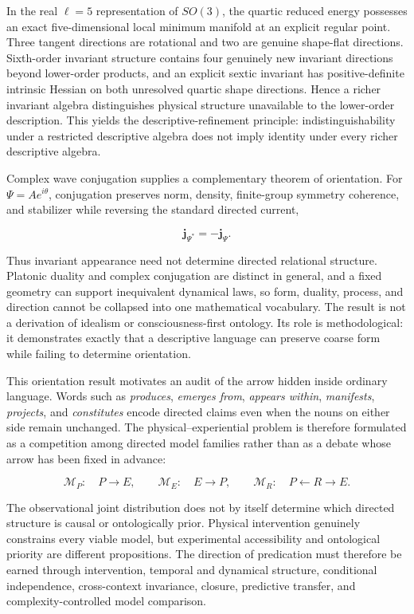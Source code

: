 In the real $\ell=5$ representation of $SO(3)$, the quartic reduced energy possesses an exact five-dimensional local minimum manifold at an explicit regular point. Three tangent directions are rotational and two are genuine shape-flat directions. Sixth-order invariant structure contains four genuinely new invariant directions beyond lower-order products, and an explicit sextic invariant has positive-definite intrinsic Hessian on both unresolved quartic shape directions. Hence a richer invariant algebra distinguishes physical structure unavailable to the lower-order description. This yields the descriptive-refinement principle: indistinguishability under a restricted descriptive algebra does not imply identity under every richer descriptive algebra.

Complex wave conjugation supplies a complementary theorem of orientation. For $\Psi=Ae^{i\theta}$, conjugation preserves norm, density, finite-group symmetry coherence, and stabilizer while reversing the standard directed current,

\[
\mathbf j_{\Psi^*}=-\mathbf j_\Psi.
\]

Thus invariant appearance need not determine directed relational structure. Platonic duality and complex conjugation are distinct in general, and a fixed geometry can support inequivalent dynamical laws, so form, duality, process, and direction cannot be collapsed into one mathematical vocabulary. The result is not a derivation of idealism or consciousness-first ontology. Its role is methodological: it demonstrates exactly that a descriptive language can preserve coarse form while failing to determine orientation.

This orientation result motivates an audit of the arrow hidden inside ordinary language. Words such as \emph{produces}, \emph{emerges from}, \emph{appears within}, \emph{manifests}, \emph{projects}, and \emph{constitutes} encode directed claims even when the nouns on either side remain unchanged. The physical--experiential problem is therefore formulated as a competition among directed model families rather than as a debate whose arrow has been fixed in advance:

\[
\mathcal M_P:\quad P\longrightarrow E,
\qquad
\mathcal M_E:\quad E\longrightarrow P,
\qquad
\mathcal M_R:\quad P\longleftarrow R\longrightarrow E.
\]

The observational joint distribution does not by itself determine which directed structure is causal or ontologically prior. Physical intervention genuinely constrains every viable model, but experimental accessibility and ontological priority are different propositions. The direction of predication must therefore be earned through intervention, temporal and dynamical structure, conditional independence, cross-context invariance, closure, predictive transfer, and complexity-controlled model comparison.

